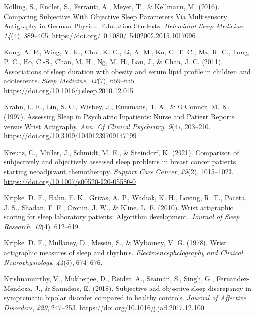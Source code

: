 \documentclass[
]{article}
\newlength{\cslhangindent}
\newenvironment{CSLReferences}[2] %
 {\begin{list}{}{%
  \setlength{\itemindent}{0pt}
  \setlength{\leftmargin}{0pt}
  \setlength{\parsep}{0pt}
  \ifodd #1
   \setlength{\leftmargin}{\cslhangindent}
   \setlength{\itemindent}{-1\cslhangindent}
  \fi
  \setlength{\itemsep}{#2\baselineskip}}}
 {\end{list}}
\begin{document}
\begin{CSLReferences}{1}{0}
Kölling, S., Endler, S., Ferrauti, A., Meyer, T., \& Kellmann, M. (2016). Comparing {Subjective} {With} {Objective} {Sleep} {Parameters} {Via} {Multisensory} {Actigraphy} in {German} {Physical} {Education} {Students}. \emph{Behavioral Sleep Medicine}, \emph{14}(4), 389--405. \url{https://doi.org/10.1080/15402002.2015.1017096}

Kong, A. P., Wing, Y.-K., Choi, K. C., Li, A. M., Ko, G. T. C., Ma, R. C., Tong, P. C., Ho, C.-S., Chan, M. H., Ng, M. H., Lau, J., \& Chan, J. C. (2011). Associations of sleep duration with obesity and serum lipid profile in children and adolescents. \emph{Sleep Medicine}, \emph{12}(7), 659--665. \url{https://doi.org/10.1016/j.sleep.2010.12.015}

Krahn, L. E., Lin, S. C., Wisbey, J., Rummans, T. A., \& O'Connor, M. K. (1997). Assessing {Sleep} in {Psychiatric} {Inpatients}: {Nurse} and {Patient} {Reports} versus {Wrist} {Actigraphy}. \emph{Ann. Of Clinical Psychiatry}, \emph{9}(4), 203--210. \url{https://doi.org/10.3109/10401239709147799}

Kreutz, C., Müller, J., Schmidt, M. E., \& Steindorf, K. (2021). Comparison of subjectively and objectively assessed sleep problems in breast cancer patients starting neoadjuvant chemotherapy. \emph{Support Care Cancer}, \emph{29}(2), 1015--1023. \url{https://doi.org/10.1007/s00520-020-05580-0}

Kripke, D. F., Hahn, E. K., Grizas, A. P., Wadiak, K. H., Loving, R. T., Poceta, J. S., Shadan, F. F., Cronin, J. W., \& Kline, L. E. (2010). Wrist actigraphic scoring for sleep laboratory patients: Algorithm development. \emph{Journal of Sleep Research}, \emph{19}(4), 612--619.

Kripke, D. F., Mullaney, D., Messin, S., \& Wyborney, V. G. (1978). Wrist actigraphic measures of sleep and rhythms. \emph{Electroencephalography and Clinical Neurophysiology}, \emph{44}(5), 674--676.

Krishnamurthy, V., Mukherjee, D., Reider, A., Seaman, S., Singh, G., Fernandez-Mendoza, J., \& Saunders, E. (2018). Subjective and objective sleep discrepancy in symptomatic bipolar disorder compared to healthy controls. \emph{Journal of Affective Disorders}, \emph{229}, 247--253. \url{https://doi.org/10.1016/j.jad.2017.12.100}


\end{CSLReferences}
\end{document}
